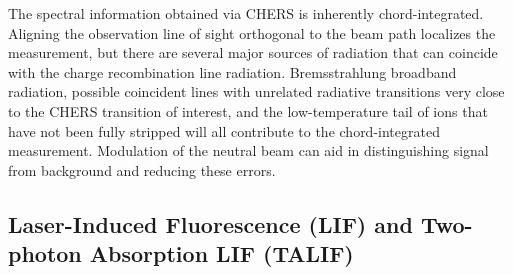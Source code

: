 \documentclass{jpp}
\begin{document}
The spectral information obtained via CHERS is inherently chord-integrated. Aligning the observation line of sight orthogonal to the beam path localizes the measurement, but there are several major sources of radiation that can coincide with the charge recombination line radiation. Bremsstrahlung broadband radiation, possible coincident lines with unrelated radiative transitions very close to the CHERS transition of interest, and the low-temperature tail of ions that have not been fully stripped will all contribute to the chord-integrated measurement. Modulation of the neutral beam can aid in distinguishing signal from background and reducing these errors.


\subsection{Laser-Induced Fluorescence (LIF) and Two-photon Absorption LIF (TALIF)}
\end{document}
